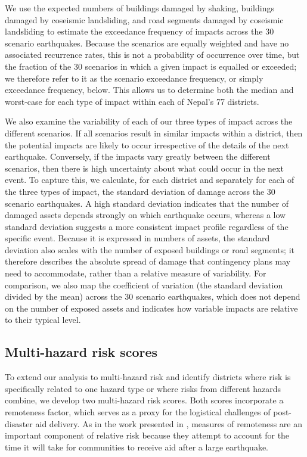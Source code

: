 \documentclass[preprint,12pt,authoryear]{elsarticle}
\begin{document}
We use the expected numbers of buildings damaged by shaking, buildings damaged by coseismic landsliding, and road segments damaged by coseismic landsliding to estimate the exceedance frequency of impacts across the 30 scenario earthquakes. Because the scenarios are equally weighted and have no associated recurrence rates, this is not a probability of occurrence over time, but the fraction of the 30 scenarios in which a given impact is equalled or exceeded; we therefore refer to it as the scenario exceedance frequency, or simply exceedance frequency, below. This allows us to determine both the median and worst-case for each type of impact within each of Nepal's 77 districts.

We also examine the variability of each of our three types of impact across the different scenarios. If all scenarios result in similar impacts within a district, then the potential impacts are likely to occur irrespective of the details of the next earthquake. Conversely, if the impacts vary greatly between the different scenarios, then there is high uncertainty about what could occur in the next event. To capture this, we calculate, for each district and separately for each of the three types of impact, the standard deviation of damage across the 30 scenario earthquakes. A high standard deviation indicates that the number of damaged assets depends strongly on which earthquake occurs, whereas a low standard deviation suggests a more consistent impact profile regardless of the specific event. Because it is expressed in numbers of assets, the standard deviation also scales with the number of exposed buildings or road segments; it therefore describes the absolute spread of damage that contingency plans may need to accommodate, rather than a relative measure of variability. For comparison, we also map the coefficient of variation (the standard deviation divided by the mean) across the 30 scenario earthquakes, which does not depend on the number of exposed assets and indicates how variable impacts are relative to their typical level.

\subsection{Multi-hazard risk scores}
\label{sec:riskscores}

To extend our analysis to multi-hazard risk and identify districts where risk is specifically related to one hazard type or where risks from different hazards combine, we develop two multi-hazard risk scores. Both scores incorporate a remoteness factor, which serves as a proxy for the logistical challenges of post-disaster aid delivery. As in the work presented in \cite{Robinson2018}, measures of remoteness are an important component of relative risk because they attempt to account for the time it will take for communities to receive aid after a large earthquake.
\end{document}
